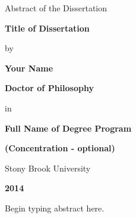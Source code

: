 \centerline{Abstract of the Dissertation}
\vspace*{1\baselineskip}
\centerline{\bf{Title of Dissertation}}
\vspace*{1\baselineskip}
\centerline{by}
\vspace*{1\baselineskip}
\centerline{\bf{Your Name}}
\vspace*{1\baselineskip}
\centerline{\bf{Doctor of Philosophy}}
\vspace*{1\baselineskip}
\centerline{in}
\vspace*{1\baselineskip}
\centerline{\bf{Full Name of Degree Program}}
\vspace*{1\baselineskip}
\centerline{\bf{(Concentration - optional)}}
\vspace*{1\baselineskip}
\centerline{Stony Brook University}
\vspace*{1\baselineskip}
\centerline{\bf{2014}}
\vspace*{2\baselineskip}
Begin typing abstract here.

\newpage
